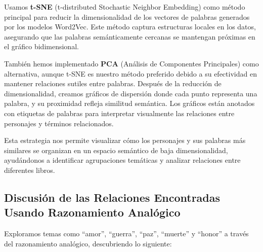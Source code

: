 \documentclass[11pt,english]{article}
\theoremstyle{plain}
\begin{document}
Usamos \textbf{t-SNE} (t-distributed Stochastic Neighbor Embedding) como método principal para reducir la dimensionalidad de los vectores de palabras generados por los modelos Word2Vec. Este método captura estructuras locales en los datos, asegurando que las palabras semánticamente cercanas se mantengan próximas en el gráfico bidimensional.

También hemos implementado \textbf{PCA} (Análisis de Componentes Principales) como alternativa, aunque t-SNE es nuestro método preferido debido a su efectividad en mantener relaciones sutiles entre palabras. Después de la reducción de dimensionalidad, creamos gráficos de dispersión donde cada punto representa una palabra, y su proximidad refleja similitud semántica. Los gráficos están anotados con etiquetas de palabras para interpretar visualmente las relaciones entre personajes y términos relacionados.

Esta estrategia nos permite visualizar cómo los personajes y sus palabras más similares se organizan en un espacio semántico de baja dimensionalidad, ayudándonos a identificar agrupaciones temáticas y analizar relaciones entre diferentes libros.

\subsection*{Discusión de las Relaciones Encontradas Usando Razonamiento Analógico}

Exploramos temas como ``amor'', ``guerra'', ``paz'', ``muerte'' y ``honor'' a través del razonamiento analógico, descubriendo lo siguiente:
\end{document}
